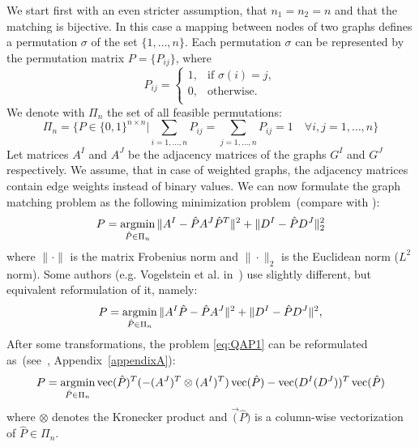 We start first with an even stricter assumption, that $n_1=n_2=n$ and that the matching is bijective. In this case a mapping between nodes of two graphs defines a permutation $\sigma$ of the set $\{1,\dots,n\}$. Each permutation $\sigma$ can be represented by the permutation matrix $P=\{P_{ij}\}$, where
\begin{equation*}
P_{ij}=\begin{cases}
 1, & \text{if } \sigma(i)=j, \\
 0, & \text{otherwise.} \\
\end{cases}
\end{equation*}
We denote with $\Pi_n$ the set of all feasible permutations:
\begin{equation*}
\Pi_n=\{P\in\{0,1\}^{n\times n}|\sum_{i=1,\dots,n}P_{ij}=\sum_{j=1,\dots,n}P_{ij}=1\quad\forall i,j=1,\dots,n\}
\end{equation*}
Let matrices $A^I$ and $A^J$ be the adjacency matrices of the graphs $G^I$ and $G^J$ respectively. We assume, that in case of weighted graphs, the adjacency matrices contain edge weights instead of binary values. We can now formulate the graph matching problem as the following minimization problem~(compare with \cite{Herault1990_SimulatedAnnealing,FastPFP,Lyzinski2015,Roth2001,Umeyam1988,Zazlavskiy2008_PATH}):
\begin{equation} \label{eq:QAP1}
P = \mathop{\rm argmin}_{\hat{P}\in\Pi_n}\|A^I-\hat{P}A^J\hat{P}^T\|^2+\|D^I-\hat{P}D^J\|^2_2
\end{equation}
where $\|\cdot\|$ is the matrix Frobenius norm and $\|\cdot\|_2$ is the Euclidean norm ($L^2$ norm). Some authors (e.g. Vogelstein et al. in~\cite{Vogelstein_BrainGraphs}) use slightly different, but equivalent reformulation of it, namely:
\begin{equation} \label{eq:QAP2}
P = \mathop{\rm argmin}_{\hat{P}\in\Pi_n}\|A^I\hat{P}-\hat{P}A^J\|^2+\|D^I-\hat{P}D^J\|^2,
\end{equation}
After some transformations, the problem \eqref{eq:QAP1} can be reformulated as~(see~\cite{Burkard98thequadratic}, Appendix~\ref{appendixA}):
\begin{equation} \label{eq:QAP3}
P = \mathop{\rm argmin}_{\hat{P}\in\Pi_n}\mathop{\rm vec}(\hat{P})^T(-(A^J)^T\otimes(A^I)^T)\mathop{\rm vec}(\hat{P})-\mathop{\rm vec}(D^I(D^J))^T\mathop{\rm vec}(\hat{P})
\end{equation}
where $\otimes$ denotes the Kronecker product and $\vec(\hat{P})$ is a column-wise vectorization of $\hat{P}\in\Pi_n$.

